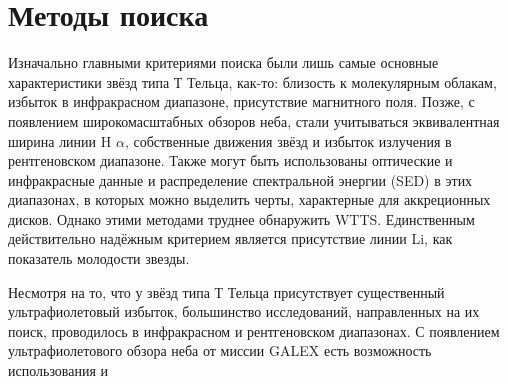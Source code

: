 

\section{Методы поиска}
 Изначально главными критериями поиска были лишь самые основные характеристики звёзд типа Т Тельца, как-то: близость к молекулярным облакам, избыток в инфракрасном диапазоне, присутствие магнитного поля. Позже, с появлением широкомасштабных обзоров неба, стали учитываться эквивалентная ширина линии H $\alpha$, собственные движения звёзд и избыток излучения в рентгеновском диапазоне. Также могут быть использованы оптические и инфракрасные данные и распределение спектральной энергии (SED) в этих диапазонах, в которых можно выделить черты, характерные для аккреционных дисков. Однако этими методами труднее обнаружить WTTS. Единственным действительно надёжным критерием является присутствие линии Li, как показатель молодости звезды.

Несмотря на то, что у звёзд типа Т Тельца присутствует существенный ультрафиолетовый избыток, большинство исследований, направленных на их поиск, проводилось в инфракрасном и рентгеновском диапазонах. С появлением ультрафиолетового обзора неба от миссии GALEX есть возможность использования и 



